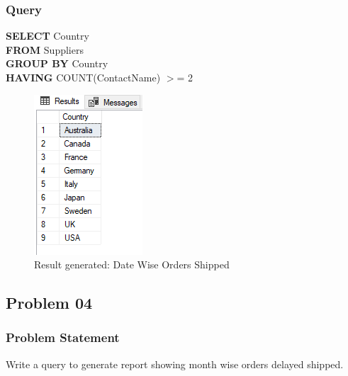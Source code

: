 \documentclass[12pt,a4paper]{report}
\begin{document}
\subsubsection{Query}
\begin{center}
	\begin{minipage}{12cm}
		\textbf{SELECT} Country\\
		\textbf{FROM} Suppliers\\
		\textbf{GROUP BY} Country \\
		\textbf{HAVING} COUNT(ContactName) $>$= 2
	\end{minipage}
	\begin{figure}[h]
	\centering
		\includegraphics[scale=0.7]{images/5.png}
		\caption{Result generated: Date Wise Orders Shipped}
	\end{figure}
\end{center}

\subsection{Problem 04}
\subsubsection{Problem Statement}
Write a query to generate report showing month wise orders delayed shipped.
\end{document}
